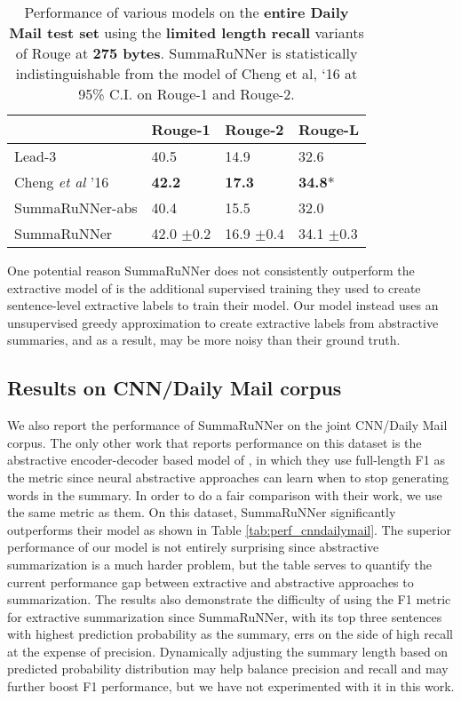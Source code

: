 \documentclass[letterpaper]{article}
\begin{document}
\begin{table}[ht]
\centering
\begin{tabular}{|l|l|l|l|}
\hline
 & Rouge-1 & Rouge-2 & Rouge-L \\
 \hline
Lead-3 & 40.5 & 14.9 & 32.6 \\
Cheng {\it et al} '16 & {\bf 42.2} & {\bf 17.3} & {\bf 34.8}* \\
SummaRuNNer-abs &  40.4  & 15.5  & 32.0 \\
SummaRuNNer &  42.0 $\pm 0.2$ & 16.9 $\pm 0.4$  & 34.1 $\pm 0.3$ \\
\hline
\end{tabular}
\caption{{\small Performance of various models on the {\bf entire Daily Mail test set} using the {\bf limited length recall} variants of Rouge at {\bf 275 bytes}. SummaRuNNer is statistically indistinguishable from the model of  Cheng et al, `16 at 95\% C.I. on Rouge-1 and Rouge-2.}}
\label{tab:test_perf_275b}
\end{table}

One potential reason SummaRuNNer does not consistently outperform the extractive model of \cite{jianpeng} is the additional supervised training they used to create sentence-level extractive labels to train their model. Our model instead uses an unsupervised greedy approximation to create extractive labels from abstractive summaries, and as a result, may be more noisy than their ground truth.

\subsection{Results on CNN/Daily Mail corpus}

We also report the performance of SummaRuNNer on the joint CNN/Daily Mail corpus. The only other work that reports performance on this dataset is the abstractive encoder-decoder based model of \cite{nallapati_conll}, in which they use full-length F1 as the metric since neural abstractive approaches can learn when to stop generating words in the summary. In order to do a fair comparison with their work, we use the same metric as them. On this dataset, SummaRuNNer significantly outperforms their model as shown in Table \ref{tab:perf_cnndailymail}. The superior performance of our model is not entirely surprising since abstractive summarization is a much harder problem, but the table serves to quantify the current performance gap between extractive and abstractive approaches to summarization. The results also demonstrate the difficulty of using the F1 metric for extractive summarization since SummaRuNNer, with its top three sentences with highest prediction probability as the summary, errs on the side of high recall at the expense of precision. Dynamically adjusting the summary length based on predicted probability distribution may help balance precision and recall and may further boost F1 performance, but we have not experimented with it in this work.
\end{document}
